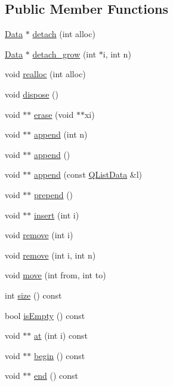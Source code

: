 \subsection*{Public Member Functions}
\begin{DoxyCompactItemize}
\item 
\hyperlink{struct_q_list_data_1_1_data}{Data} $\ast$ \hyperlink{struct_q_list_data_a4e17bcd552f357900d962fa495fa3448}{detach} (int alloc)
\item 
\hyperlink{struct_q_list_data_1_1_data}{Data} $\ast$ \hyperlink{struct_q_list_data_aad47b203505d5b3bfefc320a701b952c}{detach\+\_\+grow} (int $\ast$i, int n)
\item 
void \hyperlink{struct_q_list_data_a5eee854eba14729f3ae43d02857ac49f}{realloc} (int alloc)
\item 
void \hyperlink{struct_q_list_data_adfe8be2a05f225111f633a34cc2662ef}{dispose} ()
\item 
void $\ast$$\ast$ \hyperlink{struct_q_list_data_a9f684947994b45db2f71c7527839a653}{erase} (void $\ast$$\ast$xi)
\item 
void $\ast$$\ast$ \hyperlink{struct_q_list_data_a502bb627164367ef1c1e88667a913eab}{append} (int n)
\item 
void $\ast$$\ast$ \hyperlink{struct_q_list_data_a895361b38a78e98b1352d48018e67905}{append} ()
\item 
void $\ast$$\ast$ \hyperlink{struct_q_list_data_a3105607f5df632d891505f1765541d07}{append} (const \hyperlink{struct_q_list_data}{Q\+List\+Data} \&l)
\item 
void $\ast$$\ast$ \hyperlink{struct_q_list_data_a8ca42a19ea2f5609b1c3177c5edfba53}{prepend} ()
\item 
void $\ast$$\ast$ \hyperlink{struct_q_list_data_a55d7b71ffde3b5643f252d31d7caaeb1}{insert} (int i)
\item 
void \hyperlink{struct_q_list_data_a5a18ef36abcbbfc40f1f12c7aad12cd2}{remove} (int i)
\item 
void \hyperlink{struct_q_list_data_a8b18c609489f9ae75aa54b7a66de8cac}{remove} (int i, int n)
\item 
void \hyperlink{struct_q_list_data_ad3d0e7fb98af4a75303c8ec6c41b4364}{move} (int from, int to)
\item 
int \hyperlink{struct_q_list_data_a31119abbcc3f54435a1a9a6ceaa7e1d7}{size} () const 
\item 
bool \hyperlink{struct_q_list_data_abdbf20504bed9b34bb4ec434190e41fc}{is\+Empty} () const 
\item 
void $\ast$$\ast$ \hyperlink{struct_q_list_data_a9933b64c4fe4e63754e60a7972828ae4}{at} (int i) const 
\item 
void $\ast$$\ast$ \hyperlink{struct_q_list_data_a26cc1ce285b8a288884004bd4c10b9bc}{begin} () const 
\item 
void $\ast$$\ast$ \hyperlink{struct_q_list_data_a7dbc6e3ee5053a809ee11d7c45ca0b17}{end} () const 
\end{DoxyCompactItemize}
